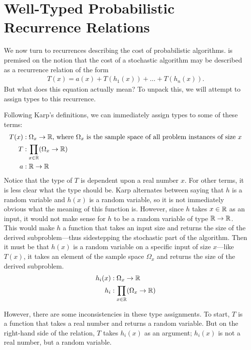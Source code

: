\chapter{Well-Typed Probabilistic Recurrence Relations}
We now turn to recurrences describing the cost of probabilistic algorithms. \cite{Karp} is premised on the notion that the cost of a stochastic algorithm may be described as a
recurrence relation of the form
\begin{align*}
T(x) = a(x) + T(h_1(x)) + \dots + T(h_n(x)).
\end{align*}
But what does this equation actually mean? To unpack this, we will attempt to assign types to this recurrence.

 Following Karp's definitions, we can immediately assign types to some of these terms:
\begin{align*}
T(x) &: \Omega_x \rightarrow \mathbb{R} \text{, where } \Omega_x \text{ is the sample space of all problem instances of size } x \\
T &: \prod_{x \in \mathbb{R}} (\Omega_x \rightarrow \mathbb{R}) \\ 
a &: \mathbb{R} \rightarrow \mathbb{R}
\end{align*}
Notice that the type of $T$ is dependent upon a real number $x$.
For other terms, it is less clear what the type should be. Karp alternates between saying that $h$ is a random 
variable and $h(x)$ is a random variable, so it is not immediately obvious 
what the meaning of this function is. However, since $h$ takes $x \in \mathbb{R}$ as an input, it would not make sense for $h$ to be a 
random variable of type $\mathbb{R} \rightarrow \mathbb{R}$. This would make $h$ a function that takes an input size and returns the 
size of the derived subproblem---thus sidestepping the stochastic part of the algorithm. Then it must be that $h(x)$ is a 
random variable on a specific input of size $x$---like $T(x)$, it takes an element of the sample space $\Omega_x$ and returns the size of the derived 
subproblem.
\begin{align*}
h_i(x) &: \Omega_x \rightarrow \mathbb{R} \\
h_i &: \prod_{x \in \mathbb{R}}(\Omega_x \rightarrow \mathbb{R}) 
\end{align*} 

However, there are some inconsistencies in these type assignments. To start, $T$ is a function that takes a real number and 
returns a random variable. But on the right-hand side of the relation, $T$ takes $h_i(x)$ as an argument; $h_i(x)$ is
not a real number, but a random variable. 

